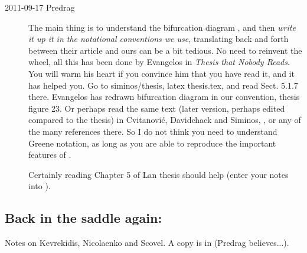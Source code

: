 \begin{description}
\item[2011-09-17 Predrag] The main thing is to understand the bifurcation
diagram , and then \emph{write it up it in the
notational conventions we use}, translating back and forth between their
article and ours can be a bit tedious. No need to reinvent the wheel, all
this has been done by Evangelos in
\emph{
           {Thesis that Nobody Reads}}.
You will warm his heart if you convince him that you have read it, and it
has helped you. Go to siminos/thesis, latex thesis.tex, and read Sect.
5.1.7 there. Evangelos has redrawn bifurcation diagram
 in our convention, thesis figure 23. Or perhaps
read the same text (later version, perhaps edited compared to the thesis)
in Cvitanovi{\'c}, Davidchack and Siminos, ,
or any of the many references there. So I do not think you need to
understand Greene notation, as long as you are able to reproduce the
important features of .

Certainly reading Chapter 5 of  Lan thesis
should help (enter your notes into ).

\end{description}

\subsection{Back in the saddle again:}
\label{s:KNSks90}

Notes on Kevrekidis, Nicolaenko and Scovel. A copy is in
(Predrag believes...).

